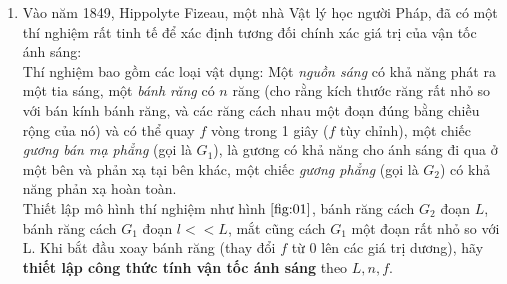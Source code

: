 \begin{enumerate}
    \item
    Vào năm 1849, Hippolyte Fizeau, một nhà Vật lý học người Pháp, đã có một thí nghiệm rất tinh tế để xác định tương đối chính xác giá trị của vận tốc ánh sáng: \\

    Thí nghiệm bao gồm các loại vật dụng: Một \textit{nguồn sáng} có khả năng phát ra một tia sáng, một \textit{bánh răng} có $n$ răng (cho rằng kích thước răng rất nhỏ so với bán kính bánh răng, và các răng cách nhau một đoạn đúng bằng chiều rộng của nó) và có thể quay $f$ vòng trong 1 giây ($f$ tùy chỉnh), một chiếc \textit{gương bán mạ phẳng} (gọi là $G_1$), là gương có khả năng cho ánh sáng đi qua ở một bên và phản xạ tại bên khác, một chiếc \textit{gương phẳng} (gọi là $G_2$) có khả năng phản xạ hoàn toàn. \\

    Thiết lập mô hình thí nghiệm như hình $\ref{fig:01}$, bánh răng cách $G_2$ đoạn $L$, bánh răng cách $G_1$ đoạn $l << L$, mắt cũng cách $G_1$ một đoạn rất nhỏ so với L. Khi bắt đầu xoay bánh răng (thay đổi $f$ từ $0$ lên các giá trị dương), hãy \textbf{thiết lập công thức tính vận tốc ánh sáng} theo $L, n, f$. \\
     
\begin{figure}[!h]
    \centering
\end{figure}
\end{enumerate}
